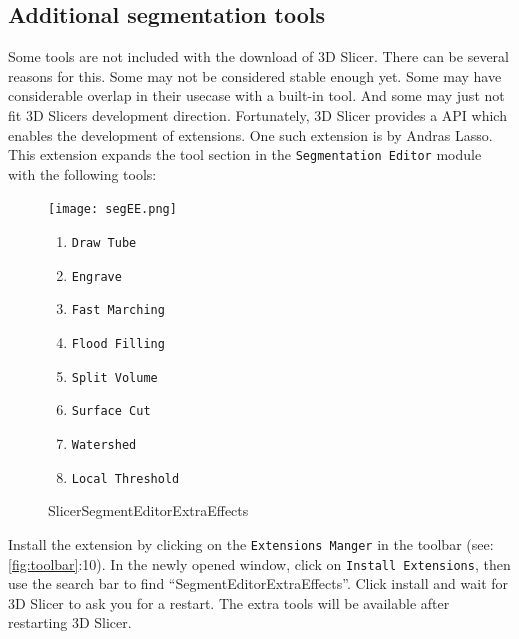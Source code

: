 \subsection{Additional segmentation tools}
Some tools are not included with the download of 3D Slicer.
There can be several reasons for this.
Some may not be considered stable enough yet.
Some may have considerable overlap in their usecase with a built-in tool.
And some may just not fit 3D Slicers development direction.
Fortunately, 3D Slicer provides a API which enables the development of extensions.
One such extension is \cite{lassoSlicerSegmentEditorExtraEffects2024} by Andras Lasso.
This extension expands the tool section in the \texttt{Segmentation Editor} module with the following tools:
\begin{figure}[h]
	\begin{minipage}{0.4\textwidth}
		\centering
		\texttt{[image: segEE.png]}
		\caption{SlicerSegmentEditorExtraEffects}\label{segEE}
	\end{minipage}%
	\begin{minipage}{0.5\textwidth}
		\begin{enumerate} %
			\item \texttt{Draw Tube}
			\item \texttt{Engrave}
			\item \texttt{Fast Marching}
			\item \texttt{Flood Filling}
			\item \texttt{Split Volume}
			\item \texttt{Surface Cut}
			\item \texttt{Watershed}
			\item \texttt{Local Threshold}
		\end{enumerate}
	\end{minipage}
\end{figure}
\mbox{}

\noindent
Install the extension by clicking on the \texttt{Extensions Manger} in the toolbar (see: \cref{fig:toolbar}:10).
In the newly opened window, click on \texttt{Install Extensions}, then use the search bar to find ``SegmentEditorExtraEffects''.
Click install and wait for 3D Slicer to ask you for a restart.
The extra tools will be available after restarting 3D Slicer.

\pagebreak
